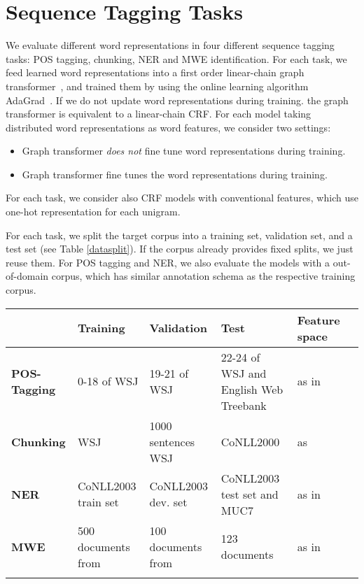 \section{Sequence Tagging Tasks}
\label{sec:SeqTagging}

We evaluate different word representations in four different sequence tagging tasks: POS tagging, chunking, NER and MWE identification. For each task, we feed learned word representations into a first order linear-chain graph transformer~\cite{collobert2011natural}, and trained them by using the online learning algorithm AdaGrad~\cite{duchi2011adaptive}. If we do not update word representations during training. the graph transformer is equivalent to a linear-chain CRF. For each model taking distributed word representations as word features, we consider two settings: 
\begin{small}
\begin{itemize}
\item[-] Graph transformer \textit{does not} fine tune word representations during training.
\item[-] Graph transformer fine tunes the word representations during training.
\end{itemize}
\end{small}
For each task, we consider also CRF models with conventional features, which use one-hot representation for each unigram.

For each task, we split the target corpus into a training set, validation set, and a test set (see Table \ref{datasplit}). If the corpus already provides fixed splits, we just reuse them. For POS tagging and NER, we also evaluate the models with a out-of-domain corpus, which has similar annotation schema as the respective training corpus.

\begin{table*}
\begin{small}
\begin{tabular}{lllp{3cm}ll}
\hline
			& \textbf{Training} & \textbf{Validation} & \textbf{Test} & \textbf{Feature space} \\ \hline
\textbf{POS-Tagging} & 0-18 of WSJ & 19-21 of WSJ & 22-24 of WSJ and English Web Treebank & as in~\cite{collobert2011natural} \\
\textbf{Chunking} & WSJ & 1000 sentences WSJ & CoNLL2000 & as~\cite{turian2010word}\\
\textbf{NER} & CoNLL2003 train set & CoNLL2003 dev. set & CoNLL2003 test set and MUC7 & as in~\cite{turian2010word} \\
\textbf{MWE} & 500 documents from & 100 documents from & 123 documents & as in~\cite{mwecorpus}\\
\hline
\label{datasplit}
\caption{Datasets and features for each task.}
\end{tabular}
\end{small}
\end{table*}

